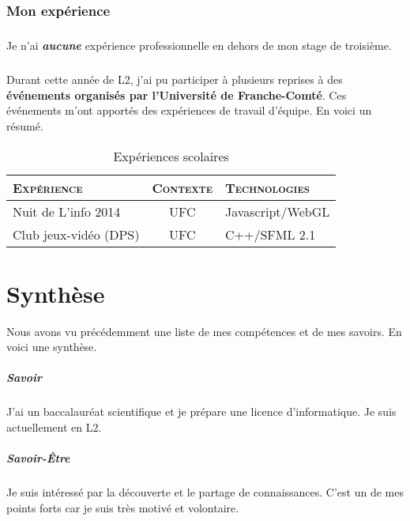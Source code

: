 \documentclass[a4paper,12pt, draft]{report}
\newcommand{\tabTitle}[1]{\hfill{} \textsc{#1} \hfill{} }
\begin{document}
\subsection{Mon expérience}
\paragraph{}
Je n'ai \textit{\textbf{aucune}} expérience professionnelle en dehors de mon stage de troisième.

\paragraph{}
Durant cette année de L2, j'ai pu participer à plusieurs reprises à des \textbf{événements organisés par l'Université de Franche-Comté}. Ces événements m'ont apportés des expériences de travail d'équipe. En voici un résumé.

\begin{table}[h]
\begin{tabular}{|l|c|l|}
\hline
\tabTitle{Expérience}  &  \tabTitle{Contexte} & \tabTitle{Technologies}\\
\hline
Nuit de L'info 2014  & UFC & Javascript/WebGL\\
\hline
Club jeux-vidéo (DPS\footnotemark{})  & UFC & C++/SFML 2.1\\
\hline
\end{tabular}
\caption{Expériences scolaires}
\end{table}

\chapter{Synthèse} \label{RefSyntheseBilanPerso}
Nous avons vu précédemment une liste de mes compétences et de mes savoirs.
En voici une synthèse.

\paragraph{Savoir}
J'ai un baccalauréat scientifique et je prépare une licence d'informatique.
Je suis actuellement en L2.

\paragraph{Savoir-Être}
Je suis intéressé par la découverte et le partage de connaissances. C'est un de mes points forts car je suis très motivé et volontaire.
\end{document}
